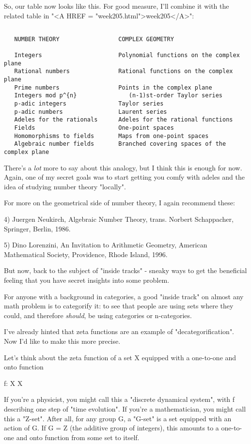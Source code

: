So, our table now looks like this.  For good measure, I'll combine it with
the related table in "<A HREF = "week205.html">week205</A>":


\begin{verbatim}

   NUMBER THEORY                 COMPLEX GEOMETRY    

   Integers                      Polynomial functions on the complex plane
   Rational numbers              Rational functions on the complex plane
   Prime numbers                 Points in the complex plane     
   Integers mod p^{n}               (n-1)st-order Taylor series
   p-adic integers               Taylor series
   p-adic numbers                Laurent series
   Adeles for the rationals      Adeles for the rational functions
   Fields                        One-point spaces
   Homomorphisms to fields       Maps from one-point spaces
   Algebraic number fields       Branched covering spaces of the complex plane
\end{verbatim}
    
There's a \emph{lot} 
more to say about this analogy, but I think this is enough 
for now.  Again, one of my secret goals was to start getting you comfy with 
adeles and the idea of studying number theory "locally".  

For more on the geometrical side of number theory, I again recommend these:

4) Juergen Neukirch, Algebraic Number Theory, trans. Norbert Schappacher, 
Springer, Berlin, 1986.

5) Dino Lorenzini, An Invitation to Arithmetic Geometry, American 
Mathematical Society, Providence, Rhode Island, 1996.

But now, back to the subject of "inside tracks" - sneaky
ways to get the beneficial feeling that you have secret insights into
some problem.

For anyone with a background in categories, a good "inside track" on 
almost any math problem is to categorify it: to see that people are using 
sets where they could, and therefore \emph{should}, be using categories or 
n-categories.

I've already hinted that zeta functions are an example of 
"decategorification".  Now I'd like to make this more precise.  

Let's think about the zeta function of a set X equipped with a one-to-one 
and onto function

f: X \to  X

If you're a physicist, you might call this a "discrete dynamical
system", with f describing one step of "time
evolution".  If you're a mathematician, you might call this a
"Z-set".  After all, for any group G, a "G-set" is
a set equipped with an action of G.  If G = Z (the additive group of
integers), this amounts to a one-to-one and onto function from some
set to itself.

